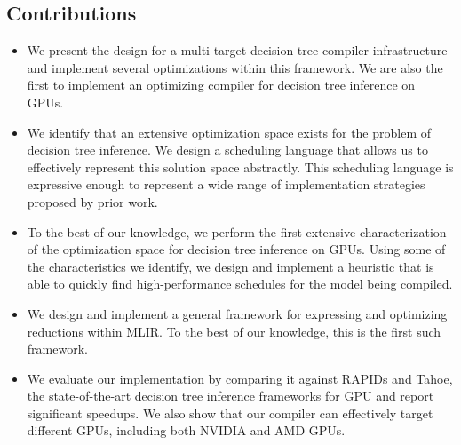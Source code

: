 \subsection{Contributions}
\begin{itemize}
  \item We present the design for a multi-target decision tree compiler infrastructure and implement several optimizations within this framework.
   We are also the first to implement an optimizing compiler for decision tree inference on GPUs.
  \item We identify that an extensive optimization space exists for the problem of decision tree inference. We design a scheduling language that 
  allows us to effectively represent this solution space abstractly. This scheduling language is expressive enough to represent a wide range of  
  implementation strategies proposed by prior work.
  \item To the best of our knowledge, we perform the first extensive characterization of the optimization space for decision tree inference 
  on GPUs. Using some of the characteristics we identify, we design and implement a heuristic that is able to quickly find high-performance 
  schedules for the model being compiled. 
  \item We design and implement a general framework for expressing and optimizing reductions within MLIR. To the best of our knowledge, this is the first
  such framework.
  \item We evaluate our implementation by comparing it against RAPIDs and Tahoe, the state-of-the-art decision tree inference frameworks for GPU and 
  report significant speedups. We also show that our compiler can effectively target different GPUs, including both NVIDIA and AMD GPUs.
\end{itemize}